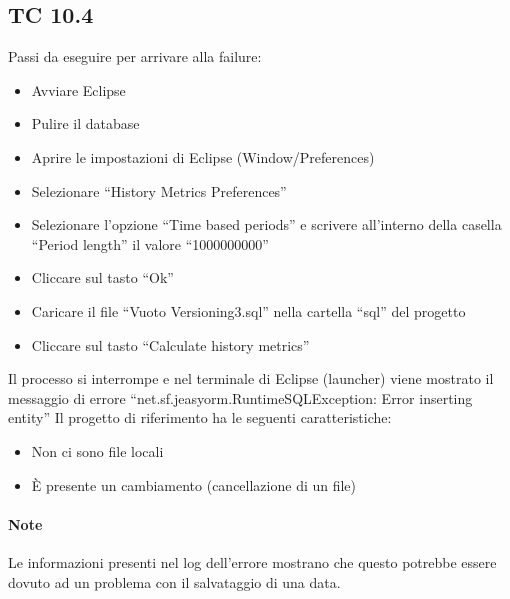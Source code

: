 \subsection*{TC 10.4}
Passi da eseguire per arrivare alla failure:
\begin{itemize}
 \item Avviare Eclipse
 \item Pulire il database
 \item Aprire le impostazioni di Eclipse (Window/Preferences)
 \item Selezionare ``History Metrics Preferences''
 \item Selezionare l'opzione ``Time based periods'' e scrivere all'interno della casella ``Period length'' il valore ``1000000000''
 \item Cliccare sul tasto ``Ok''
 \item Caricare il file ``Vuoto Versioning3.sql'' nella cartella ``sql'' del progetto
 \item Cliccare sul tasto ``Calculate history metrics''
\end{itemize}
Il processo si interrompe e nel terminale di Eclipse (launcher) viene mostrato il messaggio di errore ``net.sf.jeasyorm.RuntimeSQLException: Error inserting entity''
\newline
Il progetto di riferimento ha le seguenti caratteristiche:
\begin{itemize}
 \item Non ci sono file locali
 \item È presente un cambiamento (cancellazione di un file)
\end{itemize}

\paragraph{Note} Le informazioni presenti nel log dell'errore mostrano che questo potrebbe essere dovuto ad un problema con il salvataggio di una data.





\newpage






